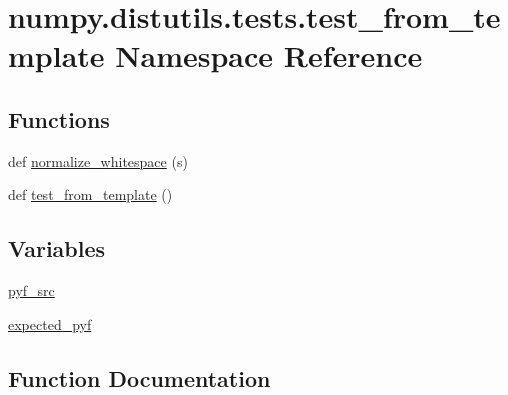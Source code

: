\hypertarget{namespacenumpy_1_1distutils_1_1tests_1_1test__from__template}{}\section{numpy.\+distutils.\+tests.\+test\+\_\+from\+\_\+template Namespace Reference}
\label{namespacenumpy_1_1distutils_1_1tests_1_1test__from__template}
\subsection*{Functions}
\begin{DoxyCompactItemize}
\item 
def \hyperlink{namespacenumpy_1_1distutils_1_1tests_1_1test__from__template_a7669ec954c45d7bfebb200fc244d40c6}{normalize\+\_\+whitespace} (s)
\item 
def \hyperlink{namespacenumpy_1_1distutils_1_1tests_1_1test__from__template_af3c0aa7585f80134f012cd117e0c9a9f}{test\+\_\+from\+\_\+template} ()
\end{DoxyCompactItemize}
\subsection*{Variables}
\begin{DoxyCompactItemize}
\item 
\hyperlink{namespacenumpy_1_1distutils_1_1tests_1_1test__from__template_a8b589e0badfb57fc015785ae895ea70f}{pyf\+\_\+src}
\item 
\hyperlink{namespacenumpy_1_1distutils_1_1tests_1_1test__from__template_ab6bb70ca64fb6ae81372f150945aa3af}{expected\+\_\+pyf}
\end{DoxyCompactItemize}


\subsection{Function Documentation}
\mbox{\label{namespacenumpy_1_1distutils_1_1tests_1_1test__from__template_a7669ec954c45d7bfebb200fc244d40c6}} 

